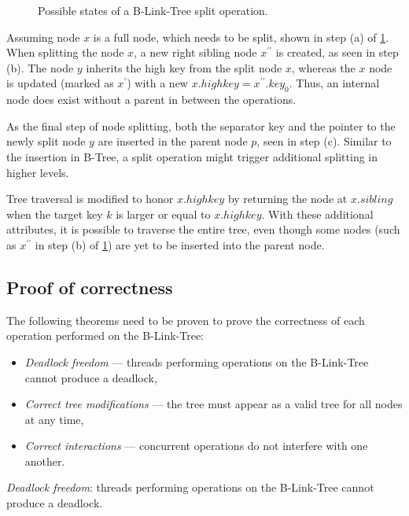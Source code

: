 \begin{figure}
  \centering
  
  \caption[Possible states of a B-Link-Tree split operation.]{Possible states of a B-Link-Tree split operation.}
  \label{figure:b-link-insert-states}
\end{figure}


Assuming node $x$ is a full node, which needs to be split, shown in step (a) of \cref{figure:b-link-insert-states}. When splitting the node $x$, a new right sibling node $x^{\prime\prime}$ is created, as seen in step (b). The node $y$ inherits the high key from the split node $x$, whereas the $x$ node is updated (marked as $x^\prime$) with a new $x.highkey = x^{\prime\prime}.key_0$. Thus, an internal node does exist without a parent in between the operations.

As the final step of node splitting, both the separator key and the pointer to the newly split node $y$ are inserted in the parent node $p$, seen in step (c). Similar to the insertion in B-Tree, a split operation might trigger additional splitting in higher levels.

Tree traversal is modified to honor $x.highkey$ by returning the node at $x.\mathit{sibling}$ when the target key $k$ is larger or equal to $x.highkey$. With these additional attributes, it is possible to traverse the entire tree, even though some nodes (such as $x^{\prime\prime}$ in step (b) of \cref{figure:b-link-insert-states}) are yet to be inserted into the parent node.

\subsection{Proof of correctness}

The following theorems need to be proven to prove the correctness of each operation performed on the B-Link-Tree:

\begin{itemize}
  \item \textit{Deadlock freedom} --- threads performing operations on the B-Link-Tree cannot produce a deadlock,
  \item \textit{Correct tree modifications} --- the tree must appear as a valid tree for all nodes at any time,
  \item \textit{Correct interactions} --- concurrent operations do not interfere with one another.
\end{itemize}

\begin{theorem}
  \textit{Deadlock freedom}: threads performing operations on the B-Link-Tree cannot produce a deadlock.
\end{theorem}

